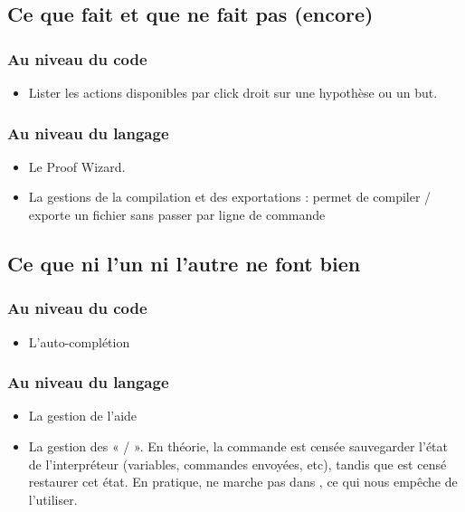     \subsection{Ce que \coqide{} fait et que \coquille{} ne fait pas (encore)}
    
        \subsubsection{Au niveau du code}

            \begin{itemize}
                \item Lister les actions disponibles par click droit sur une hypothèse ou un but.
            \end{itemize}

        \subsubsection{Au niveau du langage}
        
            \begin{itemize}
                \item Le Proof Wizard.
                \item La gestions de la compilation et des exportations : \coqide{} permet de compiler / exporte un fichier sans passer par ligne de commande
            \end{itemize}

    \subsection{Ce que ni l'un ni l'autre ne font bien}

        \subsubsection{Au niveau du code}

            \begin{itemize}
                \item L'auto-complétion
            \end{itemize}

        \subsubsection{Au niveau du langage}
        
            \begin{itemize}
                \item La gestion de l'aide
                \item La gestion des «  /  ».
                En théorie, la commande  est censée sauvegarder l'état de l'interpréteur (variables, commandes envoyées, etc), tandis que  est censé restaurer cet état.
			    En pratique,  ne marche pas dans \coqtop{}, ce qui nous empêche de l'utiliser.
            \end{itemize}


